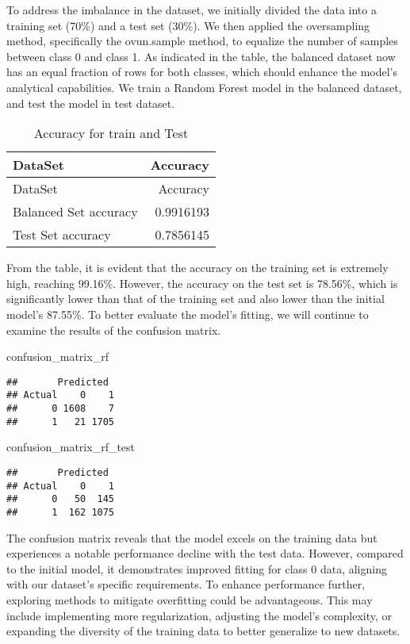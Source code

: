\documentclass[
]{article}
\newenvironment{Shaded}{\begin{snugshade}}{\end{snugshade}}
\newcommand{\NormalTok}[1]{#1}
\begin{document}
To address the imbalance in the dataset, we initially divided the data
into a training set (70\%) and a test set (30\%). We then applied the
oversampling method, specifically the ovun.sample method, to equalize
the number of samples between class 0 and class 1. As indicated in the
table, the balanced dataset now has an equal fraction of rows for both
classes, which should enhance the model's analytical capabilities. We
train a Random Forest model in the balanced dataset, and test the model
in test dataset.

\begin{longtable}[]{@{}lr@{}}
\caption{Accuracy for train and Test}\tabularnewline
\toprule\noalign{}
DataSet & Accuracy \\
\midrule\noalign{}
\endfirsthead
\toprule\noalign{}
DataSet & Accuracy \\
\midrule\noalign{}
\endhead
\bottomrule\noalign{}
\endlastfoot
Balanced Set accuracy & 0.9916193 \\
Test Set accuracy & 0.7856145 \\
\end{longtable}

From the table, it is evident that the accuracy on the training set is
extremely high, reaching 99.16\%. However, the accuracy on the test set
is 78.56\%, which is significantly lower than that of the training set
and also lower than the initial model's 87.55\%. To better evaluate the
model's fitting, we will continue to examine the results of the
confusion matrix.

\begin{Shaded}
\begin{Highlighting}[]
\NormalTok{confusion\_matrix\_rf}
\end{Highlighting}
\end{Shaded}

\begin{verbatim}
##       Predicted
## Actual    0    1
##      0 1608    7
##      1   21 1705
\end{verbatim}

\begin{Shaded}
\begin{Highlighting}[]
\NormalTok{confusion\_matrix\_rf\_test}
\end{Highlighting}
\end{Shaded}

\begin{verbatim}
##       Predicted
## Actual    0    1
##      0   50  145
##      1  162 1075
\end{verbatim}

The confusion matrix reveals that the model excels on the training data
but experiences a notable performance decline with the test data.
However, compared to the initial model, it demonstrates improved fitting
for class 0 data, aligning with our dataset's specific requirements. To
enhance performance further, exploring methods to mitigate overfitting
could be advantageous. This may include implementing more
regularization, adjusting the model's complexity, or expanding the
diversity of the training data to better generalize to new datasets.
\end{document}
